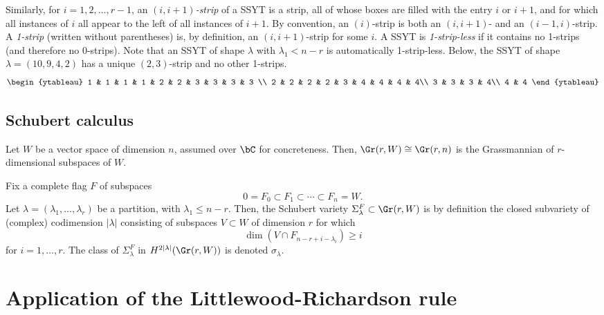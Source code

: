 Similarly, for $i=1,2,\ldots,r-1$, an \emph{$(i,i+1)$-strip} of a SSYT is a strip, all of whose boxes are filled with the entry $i$ or $i+1$, and for which all instances of $i$ all appear to the left of all instances of $i+1$. By convention, an $(i)$-strip is both an $(i,i+1)$- and an $(i-1,i)$-strip. A \emph{1-strip} (written without parentheses) is, by definition, an $(i,i+1)$-strip for some $i$. A SSYT is \emph{1-strip-less} if it contains no 1-strips (and therefore no 0-strips). Note that an SSYT of shape $\lambda$ with $\lambda_1<n-r$ is automatically 1-strip-less. Below, the SSYT of shape $\lambda=(10,9,4,2)$ has a unique $(2,3)$-strip and no other 1-strips.
\begin{equation*}
\begin{ytableau}
1 & 1 & 1 & 1 & 2 & 2 & 3 & 3 & 3 & 3 \\
2 & 2 & 2 & 2 & 3 & 4 & 4 & 4 & 4\\
3 & 3 & 3 & 4\\
4 & 4
\end{ytableau}
\end{equation*}


\subsection{Schubert calculus}\label{schubert_sec}

Let $W$ be a vector space of dimension $n$, assumed over $\bC$ for concreteness. Then, $\Gr(r,W)\cong\Gr(r,n)$ is the Grassmannian of $r$-dimensional subspaces of $W$.

Fix a complete flag $F$ of subspaces
\begin{equation*}
0=F_0\subset F_1\subset\cdots \subset F_{n}=W.
\end{equation*}
Let $\lambda=(\lambda_1,\ldots,\lambda_r)$ be a partition, with $\lambda_1\le n-r$. Then, the Schubert variety $\Sigma^F_{\lambda}\subset\Gr(r,W)$ is by definition the closed subvariety of (complex) codimension $|\lambda|$ consisting of subspaces $V\subset W$ of dimension $r$ for which
\begin{equation*}
\dim(V\cap F_{n-r+i-\lambda_{i}})\ge i
\end{equation*}
for $i=1,\ldots,r$. The class of $\Sigma^F_{\lambda}$ in $H^{2|\lambda|}(\Gr(r,W))$ is denoted $\sigma_\lambda$.

\section{Application of the Littlewood-Richardson rule}\label{LR_sec}

